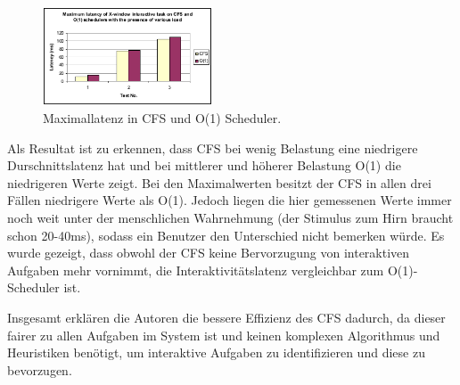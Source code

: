 \begin{figure} [h]
 	\centering
 	\includegraphics[width=0.45\textwidth]{pictures/max_latency.png}
 	\caption{Maximallatenz in CFS und O(1) Scheduler.}
 	\label{fig:max_latency}
\end{figure}
Als Resultat ist zu erkennen, dass CFS bei wenig Belastung eine niedrigere Durschnittslatenz hat und bei mittlerer und höherer Belastung O(1) die niedrigeren Werte zeigt. Bei den Maximalwerten besitzt der CFS in allen drei Fällen niedrigere Werte als O(1). Jedoch liegen die hier gemessenen Werte immer noch weit unter der menschlichen Wahrnehmung (der Stimulus zum Hirn braucht schon 20-40ms), sodass ein Benutzer den Unterschied nicht bemerken würde. Es wurde gezeigt, dass obwohl der CFS keine Bervorzugung von interaktiven Aufgaben mehr vornimmt, die Interaktivitätslatenz vergleichbar zum O(1)-Scheduler ist. 

Insgesamt erklären die Autoren die bessere Effizienz des CFS dadurch, da dieser fairer zu allen Aufgaben im System ist und keinen komplexen Algorithmus und Heuristiken benötigt, um interaktive Aufgaben zu identifizieren und diese zu bevorzugen.